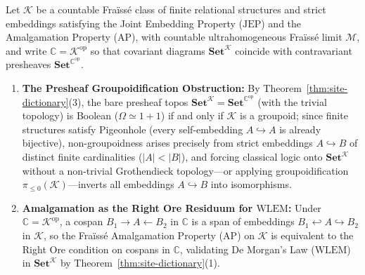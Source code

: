 \begin{theorem}\label{thm:fraisse-atomic-escape}%
%
%
Let $\mathcal{K}$ be a countable Fraïssé class of finite relational structures and strict embeddings satisfying the Joint Embedding Property ($\mathrm{JEP}$) and the Amalgamation Property ($\mathrm{AP}$), with countable ultrahomogeneous Fraïssé limit $\mathcal{M}$, and write $\mathbb{C} = \mathcal{K}^{\mathrm{op}}$ so that covariant diagrams $\mathbf{Set}^{\mathcal{K}}$ coincide with contravariant presheaves $\mathbf{Set}^{\mathbb{C}^{\mathrm{op}}}$.
\begin{enumerate}
  \item \textbf{The Presheaf Groupoidification Obstruction:} By Theorem~\ref{thm:site-dictionary}(3), the bare presheaf topos $\mathbf{Set}^{\mathcal{K}} = \mathbf{Set}^{\mathbb{C}^{\mathrm{op}}}$ (with the trivial topology) is Boolean ($\Omega \simeq 1+1$) if and only if $\mathcal{K}$ is a groupoid; since finite structures satisfy Pigeonhole (every self-embedding $A \hookrightarrow A$ is already bijective), non-groupoidness arises precisely from strict embeddings $A \hookrightarrow B$ of distinct finite cardinalities ($|A| < |B|$), and forcing classical logic onto $\mathbf{Set}^{\mathcal{K}}$ without a non-trivial Grothendieck topology---or applying groupoidification $\pi_{\le 0}(\mathcal{K})$---inverts all embeddings $A \hookrightarrow B$ into isomorphisms.
  \item \textbf{Amalgamation as the Right Ore Residuum for $\mathrm{WLEM}$:} Under $\mathbb{C} = \mathcal{K}^{\mathrm{op}}$, a cospan $B_1 \to A \leftarrow B_2$ in $\mathbb{C}$ is a span of embeddings $B_1 \hookleftarrow A \hookrightarrow B_2$ in $\mathcal{K}$, so the Fraïssé Amalgamation Property ($\mathrm{AP}$) on $\mathcal{K}$ is equivalent to the Right Ore condition on cospans in $\mathbb{C}$, validating De Morgan's Law ($\mathrm{WLEM}$) in $\mathbf{Set}^{\mathcal{K}}$ by Theorem~\ref{thm:site-dictionary}(1).

\end{enumerate}
\end{theorem}

